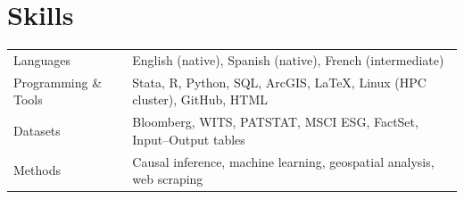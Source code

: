 \documentclass[a4paper,12pt]{article}
\begin{document}
\section{Skills}
\begin{tabularx}{\linewidth}{@{}l X@{}}
Languages & \normalsize{English (native), Spanish (native), French (intermediate)} \\
Programming \& Tools & \normalsize{Stata, R, Python, SQL, ArcGIS, \LaTeX, Linux (HPC cluster), GitHub, HTML} \\
Datasets  & \normalsize{Bloomberg, WITS, PATSTAT, MSCI ESG, FactSet, Input--Output tables} \\
Methods   & \normalsize{Causal inference, machine learning, geospatial analysis, web scraping} \\
\end{tabularx}



\vfill
{}
\end{document}
